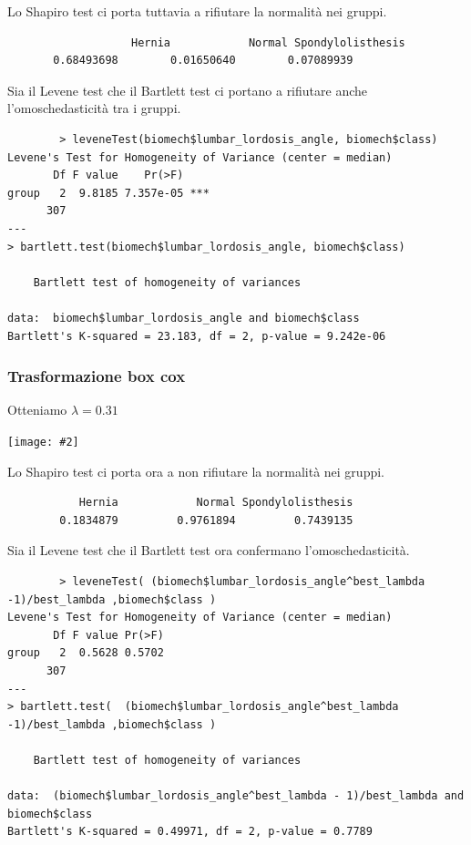 \documentclass{beamer}
\newcommand{\fg}[2]{%
  \begin{center}
      \texttt{[image: \#2]}%
  \end{center}
}
\begin{document}
\begin{frame}[fragile]
	Lo Shapiro test ci porta tuttavia a rifiutare la normalità nei gruppi.
	\begin{verbatim}
		           Hernia            Normal Spondylolisthesis 
       0.68493698        0.01650640        0.07089939
	\end{verbatim}

	Sia il Levene test che il Bartlett test ci portano a rifiutare anche l'omoschedasticità tra i gruppi.
	{\tiny
	\begin{verbatim}
		> leveneTest(biomech$lumbar_lordosis_angle, biomech$class)
Levene's Test for Homogeneity of Variance (center = median)
       Df F value    Pr(>F)    
group   2  9.8185 7.357e-05 ***
      307                      
---
> bartlett.test(biomech$lumbar_lordosis_angle, biomech$class)

	Bartlett test of homogeneity of variances

data:  biomech$lumbar_lordosis_angle and biomech$class
Bartlett's K-squared = 23.183, df = 2, p-value = 9.242e-06
	\end{verbatim}
	}
\end{frame}



\begin{frame}
	\frametitle{Trasformazione box cox}
	Otteniamo $\lambda = 0.31$
	\fg{0.6}{15boxcox}
\end{frame}




\begin{frame}[fragile]
	Lo Shapiro test ci porta ora a non rifiutare la normalità nei gruppi.
	\begin{verbatim}
           Hernia            Normal Spondylolisthesis 
        0.1834879         0.9761894         0.7439135 
	\end{verbatim}

	Sia il Levene test che il Bartlett test ora confermano l'omoschedasticità.
	{\tiny
	\begin{verbatim}
		> leveneTest( (biomech$lumbar_lordosis_angle^best_lambda -1)/best_lambda ,biomech$class )
Levene's Test for Homogeneity of Variance (center = median)
       Df F value Pr(>F)
group   2  0.5628 0.5702
      307                   
---
> bartlett.test(  (biomech$lumbar_lordosis_angle^best_lambda -1)/best_lambda ,biomech$class )

	Bartlett test of homogeneity of variances

data:  (biomech$lumbar_lordosis_angle^best_lambda - 1)/best_lambda and biomech$class
Bartlett's K-squared = 0.49971, df = 2, p-value = 0.7789
	\end{verbatim}
	}
\end{frame}
\end{document}
